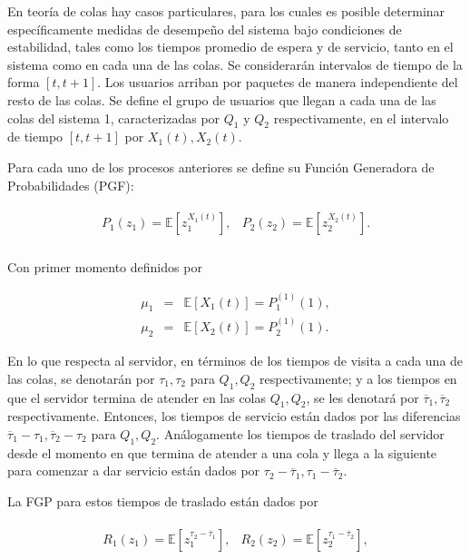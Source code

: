 \documentclass{article}
\newcommand{\esp}{\mathbb{E}}
\begin{document}
En teor\'ia de colas hay casos particulares, para los cuales es posible determinar espec\'ificamente medidas de desempe\~no del sistema bajo condiciones de estabilidad, tales como los tiempos promedio de espera y de servicio, tanto en el sistema como en cada
una de las colas. Se considerar\'an intervalos de tiempo de la forma $\left[t,t+1\right]$. Los usuarios arriban por paquetes de manera independiente del resto de las colas. Se define el grupo de usuarios que llegan a cada una de las colas del sistema 1, caracterizadas por $Q_{1}$ y $Q_{2}$ respectivamente, en el intervalo de tiempo $\left[t,t+1\right]$ por $X_{1}\left(t\right),X_{2}\left(t\right)$.

Para cada uno de los procesos anteriores se define su Funci\'on Generadora de Probabilidades (PGF):

\begin{eqnarray*}
\begin{array}{cc}
P_{1}\left(z_{1}\right)=\esp\left[z_{1}^{X_{1}\left(t\right)}\right], & P_{2}\left(z_{2}\right)=\esp\left[z_{2}^{X_{2}\left(t\right)}\right].\\
\end{array}
\end{eqnarray*}

Con primer momento definidos por

\begin{eqnarray*}
\mu_{1}&=&\esp\left[X_{1}\left(t\right)\right]=P_{1}^{(1)}\left(1\right),\\
\mu_{2}&=&\esp\left[X_{2}\left(t\right)\right]=P_{2}^{(1)}\left(1\right).
\end{eqnarray*}


En lo que respecta al servidor, en t\'erminos de los tiempos de visita a cada una de las colas, se denotar\'an por $\tau_{1},\tau_{2}$ para $Q_{1},Q_{2}$ respectivamente; y a los
tiempos en que el servidor termina de atender en las colas $Q_{1},Q_{2}$, se les denotar\'a por $\overline{\tau}_{1},\overline{\tau}_{2}$ respectivamente. Entonces, los tiempos de servicio est\'an dados por las diferencias $\overline{\tau}_{1}-\tau_{1},\overline{\tau}_{2}-\tau_{2}$ para $Q_{1},Q_{2}$. An\'alogamente los tiempos de traslado del servidor desde el momento en que termina de atender a una cola y llega a la siguiente para comenzar a dar servicio est\'an dados por $\tau_{2}-\overline{\tau}_{1},\tau_{1}-\overline{\tau}_{2}$.


La FGP para estos tiempos de traslado est\'an dados por

\begin{eqnarray*}
\begin{array}{cc}
R_{1}\left(z_{1}\right)=\esp\left[z_{1}^{\tau_{2}-\overline{\tau}_{1}}\right],
&
R_{2}\left(z_{2}\right)=\esp\left[z_{2}^{\tau_{1}-\overline{\tau}_{2}}\right],
\end{array}
\end{eqnarray*}
\end{document}
